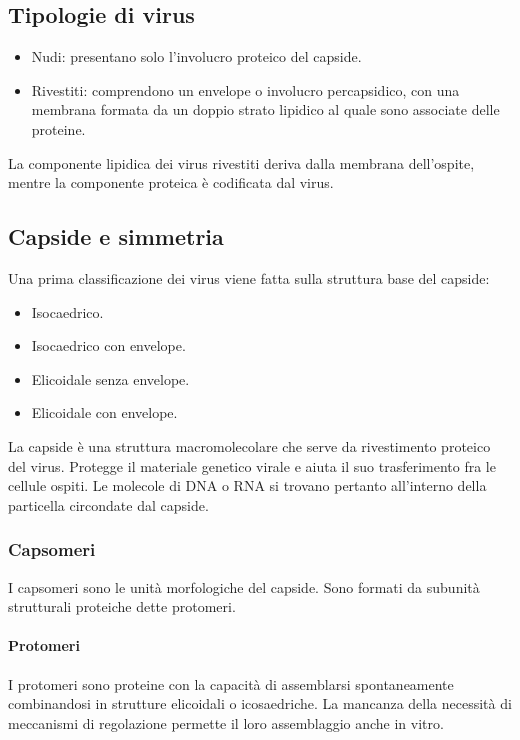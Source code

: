 	\subsection{Tipologie di virus}
	\begin{multicols}{2}
		\begin{itemize}
    			\item Nudi: presentano solo l'involucro proteico del capside.
			\item Rivestiti: comprendono un envelope o involucro percapsidico, con una membrana formata da un doppio strato lipidico al quale sono associate delle proteine. 
		\end{itemize}
	\end{multicols}
	La componente lipidica dei virus rivestiti deriva dalla membrana dell'ospite, mentre la componente proteica \`e codificata dal virus.

	\subsection{Capside e simmetria}
	Una prima classificazione dei virus viene fatta sulla struttura base del capside:
	\begin{multicols}{2}
		\begin{itemize}
		    \item Isocaedrico.
		    \item Isocaedrico con envelope.
		    \item Elicoidale senza envelope.
		    \item Elicoidale con envelope.
		\end{itemize}
	\end{multicols}
	La capside \`e una struttura macromolecolare che serve da rivestimento proteico del virus. 
	Protegge il materiale genetico virale e aiuta il suo trasferimento fra le cellule ospiti.
	Le molecole di DNA o RNA si trovano pertanto all'interno della particella circondate dal capside.

		\subsubsection{Capsomeri}
		I capsomeri sono le unit\`a morfologiche del capside.
		Sono formati da subunit\`a strutturali proteiche dette protomeri.

			\paragraph{Protomeri}
			I protomeri sono proteine con la capacit\`a di assemblarsi spontaneamente combinandosi in strutture elicoidali o icosaedriche.
			La mancanza della necessit\`a di meccanismi di regolazione permette il loro assemblaggio anche in vitro.

